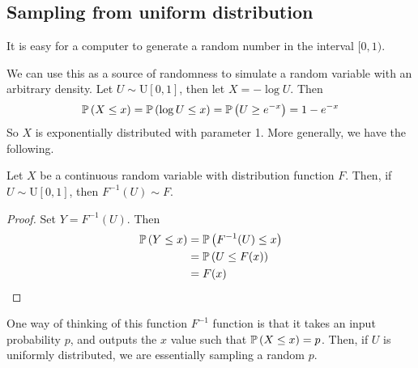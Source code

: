 \subsection{Sampling from uniform distribution}
It is easy for a computer to generate a random number in the interval \([0, 1)\).

We can use this as a source of randomness to simulate a random variable with an arbitrary density.
Let \(U \sim \mathrm{U}[0, 1]\), then let \(X = -\log U\).
Then
\[
	\mathbb{P}\left({X \leq x}\right) = \mathbb{P}\left({\log U \leq x}\right) = \mathbb{P}\left({U \geq e^{-x}}\right) = 1-e^{-x}
\]
So \(X\) is exponentially distributed with parameter 1.
More generally, we have the following.
\begin{theorem}
	Let \(X\) be a continuous random variable with distribution function \(F\).
	Then, if \(U \sim \mathrm{U}[0, 1]\), then \(F^{-1}(U) \sim F\).
\end{theorem}
\begin{proof}
	Set \(Y = F^{-1}(U)\).
	Then
	\begin{align*}
		\mathbb{P}\left({Y \leq x}\right) & = \mathbb{P}\left({F^{-1}(U) \leq x}\right) \\
		                & = \mathbb{P}\left({U \leq F(x)}\right)      \\
		                & = F(x)
	\end{align*}
\end{proof}
One way of thinking of this function \(F^{-1}\) function is that it takes an input probability \(p\), and outputs the \(x\) value such that \(\mathbb{P}\left({X \leq x}\right) = p\).
Then, if \(U\) is uniformly distributed, we are essentially sampling a random \(p\).

